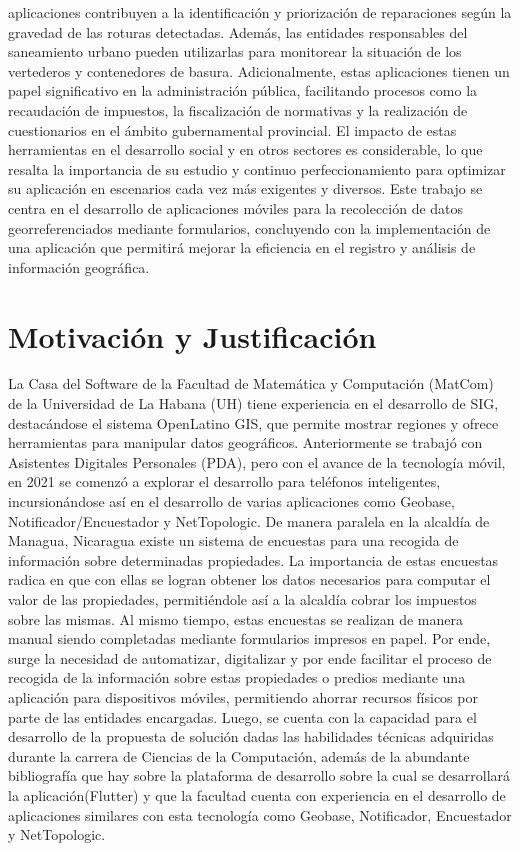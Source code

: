 aplicaciones contribuyen a la identificación y priorización de reparaciones según la
gravedad de las roturas detectadas. Además, las entidades responsables del
saneamiento urbano pueden utilizarlas para monitorear la situación de los
vertederos y contenedores de basura.
Adicionalmente, estas aplicaciones tienen un papel significativo en la administración
pública, facilitando procesos como la recaudación de impuestos, la fiscalización de
normativas y la realización de cuestionarios en el ámbito gubernamental provincial.
El impacto de estas herramientas en el desarrollo social y en otros sectores es
considerable, lo que resalta la importancia de su estudio y continuo
perfeccionamiento para optimizar su aplicación en escenarios cada vez más
exigentes y diversos.
Este trabajo se centra en el desarrollo de aplicaciones móviles para la recolección
de datos georreferenciados mediante formularios, concluyendo con la
implementación de una aplicación que permitirá mejorar la eficiencia en el registro y
análisis de información geográfica.
\section{Motivación y Justificación}
La Casa del Software de la Facultad de Matemática y Computación (MatCom) de la
Universidad de La Habana (UH) tiene experiencia en el desarrollo de SIG,
destacándose el sistema OpenLatino GIS, que permite mostrar regiones y ofrece
herramientas para manipular datos geográficos. Anteriormente se trabajó con
Asistentes Digitales Personales (PDA\cite{PDA}), pero con el avance de la tecnología móvil,
en 2021 se comenzó a explorar el desarrollo para teléfonos inteligentes,
incursionándose así en el desarrollo de varias aplicaciones como Geobase\cite{geoBase},
Notificador/Encuestador\cite{notificadorEncuestador} y NetTopologic\cite{netTopologic}.
De manera paralela en la alcaldía de Managua, Nicaragua existe un sistema de
encuestas para una recogida de información sobre determinadas propiedades. La
importancia de estas encuestas radica en que con ellas se logran obtener los datos
necesarios para computar el valor de las propiedades, permitiéndole así a la alcaldía
cobrar los impuestos sobre las mismas. Al mismo tiempo, estas encuestas se
realizan de manera manual siendo completadas mediante formularios impresos en
papel. Por ende, surge la necesidad de automatizar, digitalizar y por ende facilitar el
proceso de recogida de la información sobre estas propiedades o predios mediante
una aplicación para dispositivos móviles, permitiendo ahorrar recursos físicos por
parte de las entidades encargadas.
Luego, se cuenta con la capacidad para el desarrollo de la propuesta de solución
dadas las habilidades técnicas adquiridas durante la carrera de Ciencias de la
Computación, además de la abundante bibliografía que hay sobre la plataforma de
desarrollo sobre la cual se desarrollará la aplicación(Flutter) y que la facultad cuenta
con experiencia en el desarrollo de aplicaciones similares con esta tecnología como
Geobase, Notificador, Encuestador y NetTopologic.

